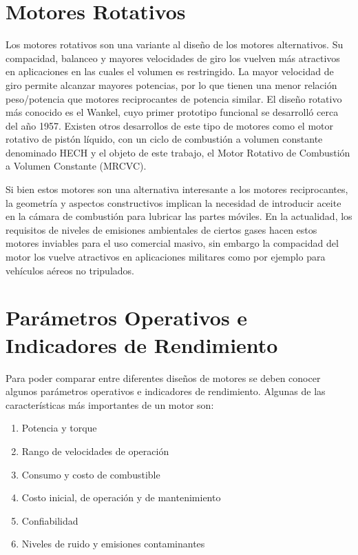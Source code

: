 
\section{Motores Rotativos}
%
Los motores rotativos son una variante al diseño de los motores alternativos.
%
Su compacidad, balanceo y mayores velocidades de giro los vuelven más atractivos
en aplicaciones en las cuales el volumen es restringido.
%
La mayor velocidad de giro permite alcanzar mayores potencias, por lo que tienen
una menor relación peso/potencia que motores reciprocantes de potencia similar.
%
El diseño rotativo más conocido es el Wankel, cuyo primer prototipo funcional se
desarrolló cerca del año 1957.
%
Existen otros desarrollos de este tipo de motores como el motor rotativo de
pistón líquido, con un ciclo de combustión a volumen constante denominado
HECH\parencite{hehc_05} y el objeto de este trabajo, el Motor Rotativo de
Combustión a Volumen Constante (MRCVC).

Si bien estos motores son una alternativa interesante a los motores
reciprocantes, la geometría y aspectos constructivos implican la necesidad de
introducir aceite en la cámara de combustión para lubricar las partes móviles.
%
%
En la actualidad, los requisitos de niveles de emisiones ambientales de ciertos
gases hacen estos motores inviables para el uso comercial masivo, sin embargo la
compacidad del motor los vuelve atractivos en aplicaciones militares como por
ejemplo para vehículos aéreos no tripulados.



\section{Parámetros Operativos e Indicadores de Rendimiento}
%
Para poder comparar entre diferentes diseños de motores se deben conocer algunos
parámetros operativos e indicadores de rendimiento.
%
Algunas de las características más importantes de un motor son:
%
\begin{enumerate}
    \item Potencia y torque
    \item Rango de velocidades de operación
    \item Consumo y costo de combustible
    \item Costo inicial, de operación y de mantenimiento
    \item Confiabilidad
    \item Niveles de ruido y emisiones contaminantes
\end{enumerate}

